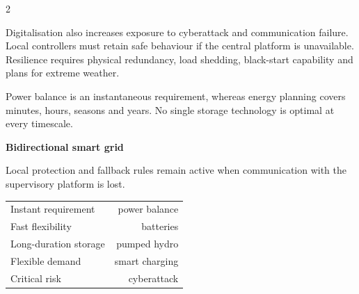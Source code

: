 \begin{multicols}{2}
\begin{ecarticle}
Digitalisation also increases exposure to cyberattack and communication failure. Local controllers
must retain safe behaviour if the central platform is unavailable. Resilience requires physical
redundancy, load shedding, black-start capability and plans for extreme weather.
\end{ecarticle}

\begin{tcolorbox}[title=\sffamily\bfseries Engineering Insight,colback=yellow!10,colframe=ECOrange]
Power balance is an instantaneous requirement, whereas energy planning covers minutes, hours, seasons
and years. No single storage technology is optimal at every timescale.
\end{tcolorbox}

\begin{engineeringfocus}
\textbf{Bidirectional smart grid}
\begin{center}
\end{center}
Local protection and fallback rules remain active when communication with the supervisory platform is lost.
\end{engineeringfocus}

\begin{keyfigures}
\begin{tabularx}{\linewidth}{@{}Xr@{}}
Instant requirement & power balance\\
Fast flexibility & batteries\\
Long-duration storage & pumped hydro\\
Flexible demand & smart charging\\
Critical risk & cyberattack
\end{tabularx}
\end{keyfigures}


\end{multicols}
